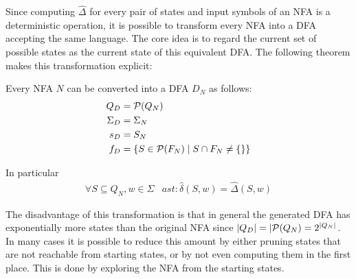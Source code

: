 Since computing $\hat\Delta$ for every pair of states and input symbols of an NFA
is a deterministic operation,
it is possible to transform every NFA into a DFA accepting the same language.
The core idea is to regard the current set of possible states as the current state of
this equivalent DFA.
The following theorem makes this transformation explicit:

\begin{theorem}
    Every NFA $N$ can be converted into a DFA $D_N$ as follows:
    \begin{align}
        Q_D &= \mathcal{P}(Q_N) \\
        \Sigma_D &= \Sigma_N \\
        s_D &= S_N \\
        f_D &= \{ S \in \mathcal{P}(F_N) \mid S \cap F_N \neq \{\} \} \\
    \end{align}

    In particular
    \begin{align}
        \forall S \subseteq Q_N, w \in \Sigma&ast: \hat\delta(S, w) = \hat\Delta(S, w)
    \end{align}
\end{theorem}

The disadvantage of this transformation is that
in general the generated DFA has exponentially more states
than the original NFA since $|Q_D| = |\mathcal{P}(Q_N) = 2^{|Q_N|}$.
In many cases it is possible to reduce this amount by either pruning states
that are not reachable from starting states,
or by not even computing them in the first place.
This is done by exploring the NFA from the starting states.
